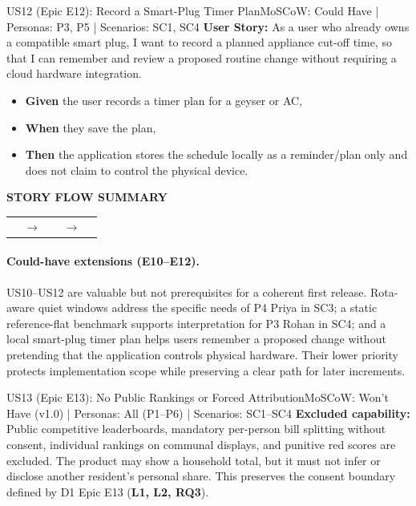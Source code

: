 \documentclass[12pt,a4paper]{article}
\makeatletter
\renewcommand{\arraystretch}{1.38}
\newcommand{\storyflow}[3]{%
  \par\Needspace{5\baselineskip}\vspace{0.08cm}%
  \begin{tcolorbox}[
    enhanced,width=\linewidth,
    colback=RowGray!72,colframe=RuleGray,
    boxrule=0.5pt,arc=1.2mm,
    borderline west={2pt}{0pt}{Teal},
    left=9pt,right=9pt,top=9pt,bottom=9pt,
    before skip=0pt,after skip=0pt
  ]
    {\sffamily\footnotesize\bfseries\color{Teal}STORY FLOW SUMMARY}\par
    \vspace{0.18cm}
    \renewcommand{\arraystretch}{1.0}%
    \begin{tabularx}{\linewidth}{@{}>{\centering\arraybackslash}X
      >{\centering\arraybackslash}p{0.52cm}
      >{\centering\arraybackslash}X
      >{\centering\arraybackslash}p{0.52cm}
      >{\centering\arraybackslash}X@{}}
      \fcolorbox{Teal!42}{white}{%
        \parbox[c][1.65cm][c]{\dimexpr\hsize-2\fboxsep-2\fboxrule\relax}{%
          \centering\sffamily\small\bfseries\color{Teal}01\par
          \vspace{3pt}\normalfont\small\color{Navy}#1}} &
      {\color{Teal}\normalsize$\to$} &
      \fcolorbox{Teal!42}{white}{%
        \parbox[c][1.65cm][c]{\dimexpr\hsize-2\fboxsep-2\fboxrule\relax}{%
          \centering\sffamily\small\bfseries\color{Teal}02\par
          \vspace{3pt}\normalfont\small\color{Navy}#2}} &
      {\color{Teal}\normalsize$\to$} &
      \fcolorbox{Teal!42}{white}{%
        \parbox[c][1.65cm][c]{\dimexpr\hsize-2\fboxsep-2\fboxrule\relax}{%
          \centering\sffamily\small\bfseries\color{Teal}03\par
          \vspace{3pt}\normalfont\small\color{Navy}#3}}
    \end{tabularx}
  \end{tcolorbox}
  \vspace{0.08cm}%
}
\makeatother
\begin{document}
\vspace{0.28cm}

\Needspace{0.30\textheight}
\begin{storybox}{US12 (Epic E12): Record a Smart-Plug Timer Plan}{MoSCoW: Could Have | Personas: P3, P5 | Scenarios: SC1, SC4}
\textbf{User Story:} As a user who already owns a compatible smart plug, I want to record a planned appliance cut-off time, so that I can remember and review a proposed routine change without requiring a cloud hardware integration.
\begin{itemize}
    \item \textbf{Given} the user records a timer plan for a geyser or AC,
    \item \textbf{When} they save the plan,
    \item \textbf{Then} the application stores the schedule locally as a reminder/plan only and does not claim to control the physical device.
\end{itemize}
\end{storybox}
\storyflow{Inspect described reference range}{Save appliance cut-off plan}{Keep plan local; no device control}

\paragraph{Could-have extensions (E10--E12).}
US10--US12 are valuable but not prerequisites for a coherent first release. Rota-aware quiet windows address the specific needs of P4 Priya in SC3; a static reference-flat benchmark supports interpretation for P3 Rohan in SC4; and a local smart-plug timer plan helps users remember a proposed change without pretending that the application controls physical hardware. Their lower priority protects implementation scope while preserving a clear path for later increments.

\clearpage
\Needspace{0.30\textheight}
\begin{storybox}{US13 (Epic E13): No Public Rankings or Forced Attribution}{MoSCoW: Won't Have (v1.0) | Personas: All (P1--P6) | Scenarios: SC1--SC4}
\textbf{Excluded capability:} Public competitive leaderboards, mandatory per-person bill splitting without consent, individual rankings on communal displays, and punitive red scores are excluded. The product may show a household total, but it must not infer or disclose another resident's personal share. This preserves the consent boundary defined by D1 Epic E13 (\textbf{L1, L2, RQ3}).
\end{storybox}
\end{document}
